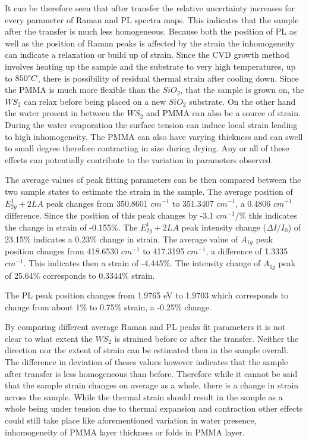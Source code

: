 	It can be therefore seen that after transfer the relative uncertainty increases for every parameter of Raman and PL spectra maps. This indicates that the sample after the transfer is much less homogeneous. Because both the position of PL as well as the position of Raman peaks is affected by the strain the inhomogeneity can indicate a relaxation or build up of strain. Since the CVD growth method involves heating up the sample and the substrate to very high temperatures, up to $850 {\degree}C$, there is possibility of residual thermal strain after cooling down. Since the PMMA is much more flexible than the $SiO_2$, that the sample is grown on, the $WS_2$ can relax before being placed on a new $SiO_2$ substrate. On the other hand the water present in between the $WS_2$ and PMMA can also be a source of strain. During the water evaporation the surface tension can induce local strain leading to high inhomogeneity. The PMMA can also have varying thickness and can swell to small degree therefore contracting in size during drying. Any or all of these effects can potentially contribute to the variation in parameters observed.
	
	The average values of peak fitting parameters can be then compared between the two sample states to estimate the strain in the sample. The average position of $E^1_{2g} + 2LA$ peak changes from 350.8601 $cm^{-1}$ to 351.3407 $cm^{-1}$, a 0.4806 $cm^{-1}$ difference. Since the position of this peak changes by -3.1 $cm^{-1} / \%$ this indicates the change in strain of -0.155$\%$. The $E^1_{2g} + 2LA$ peak intensity change ($\Delta I / I_0$) of 23.15$\%$ indicates a 0.23$\%$ change in strain. The average value of $A_{1g}$ peak position changes from 418.6530 $cm^{-1}$ to 417.3195 $cm^{-1}$, a difference of 1.3335 $cm^{-1}$. This indicates then a strain of -4.445$\%$. The intensity change of $A_{1g}$ peak of 25.64$\%$ corresponds to 0.3344$\%$ strain.
	
	The PL peak position changes from 1.9765 eV to 1.9703 which corresponds to change from about 1$\%$ to 0.75$\%$ strain, a -0.25$\%$ change.
	
	By comparing different average Raman and PL peaks fit parameters it is not clear to what extent the $WS_2$ is strained before or after the transfer. Neither the direction nor the extent of strain can be estimated then in the sample overall. The difference in deviation of theses values however indicates that the sample after transfer is less homogeneous than before. Therefore while it cannot be said that the sample strain changes on average as a whole, there is a change in strain across the sample. While the thermal strain should result in the sample as a whole being under tension due to thermal expansion and contraction other effects could still take place like aforementioned variation in water presence, inhomogeneity of PMMA layer thickness or folds in PMMA layer.
	
